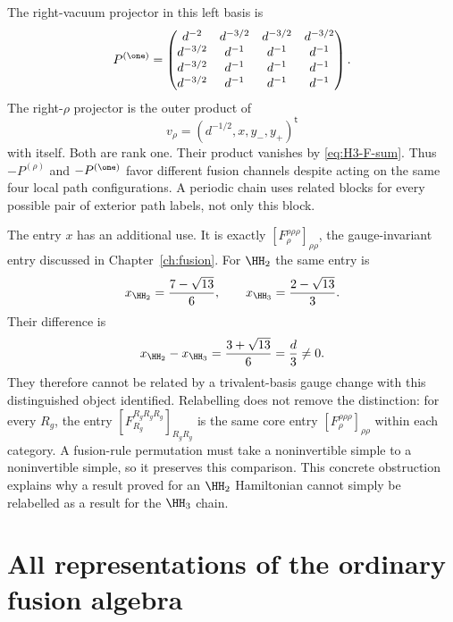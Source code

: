 \begin{example}
The right-vacuum projector in this left basis is
\[
 P^{(\one)}=
 \begin{pmatrix}
 d^{-2}&d^{-3/2}&d^{-3/2}&d^{-3/2}\\
 d^{-3/2}&d^{-1}&d^{-1}&d^{-1}\\
 d^{-3/2}&d^{-1}&d^{-1}&d^{-1}\\
 d^{-3/2}&d^{-1}&d^{-1}&d^{-1}
 \end{pmatrix}.
\]
The right-$\rho$ projector is the outer product of
\[
 v_\rho=(d^{-1/2},x,y_-,y_+)^{\mathsf t}
\]
with itself.  Both are rank one.  Their product vanishes by
\eqref{eq:H3-F-sum}.  Thus $-P^{(\rho)}$ and $-P^{(\one)}$
favor different fusion channels despite acting on the same four
local path configurations.  A periodic chain uses related blocks for
every possible pair of exterior path labels, not only this block.
\end{example}

The entry $x$ has an additional use.  It is exactly
$[F^{\rho\rho\rho}_{\rho}]_{\rho\rho}$, the gauge-invariant
entry discussed in Chapter~\ref{ch:fusion}.  For $\HH_2$ the same
entry is
\[
 x_{\HH_2}=\frac{7-\sqrt{13}}6,
 \qquad x_{\HH_3}=\frac{2-\sqrt{13}}3.
\]
Their difference is
\begin{equation}
 x_{\HH_2}-x_{\HH_3}
 =\frac{3+\sqrt{13}}6=\frac d3\ne0.
 \label{eq:H2-H3-invariant}
\end{equation}
They therefore cannot be related by a trivalent-basis gauge change
with this distinguished object identified.  Relabelling does not
remove the distinction: for every $R_g$, the entry
$[F^{R_gR_gR_g}_{R_g}]_{R_gR_g}$ is the same core entry
$[F^{\rho\rho\rho}_{\rho}]_{\rho\rho}$ within each category.
A fusion-rule permutation must take a noninvertible simple to a noninvertible
simple, so it preserves this comparison.  This concrete obstruction
explains why a result proved for an $\HH_2$ Hamiltonian cannot simply
be relabelled as a result for the $\HH_3$ chain.

\section{All representations of the ordinary fusion algebra}

